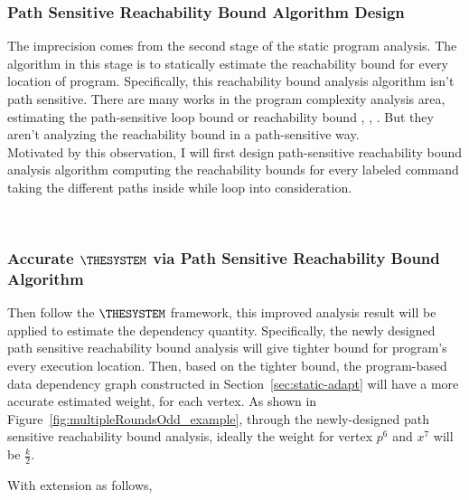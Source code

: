 \subsubsection{Path Sensitive Reachability Bound Algorithm Design}
\label{sec:refine-static-psreachability}
The imprecision comes from the second stage of the static program analysis.
The algorithm in this stage is to statically estimate the 
reachability bound for every location of program.
Specifically, this reachability bound analysis algorithm isn't path sensitive. 
There are many works in the program complexity analysis area, estimating the path-sensitive loop bound 
or reachability bound
\cite{GustafssonEL05, HumenbergerJK18}, 
\cite{BrockschmidtEFFG16,AlbertAGP08,AliasDFG10,Flores-MontoyaH14}, 
\cite{GulwaniZ10, SinnZV17,GulwaniJK09, GulwaniMC09, abs-2203-04243}. 
But they aren't analyzing the reachability
bound in a path-sensitive way.
\\
Motivated by this observation, I will first design path-sensitive reachability bound analysis algorithm computing the 
reachability bounds for every labeled command taking the different paths inside while loop into consideration.

\\
\subsubsection{Accurate $\THESYSTEM$ via Path Sensitive Reachability Bound Algorithm}
\label{sec:refine-static}
Then follow the $\THESYSTEM$ framework,
this improved analysis result will be applied to estimate the dependency quantity.
Specifically, the newly designed path sensitive reachability bound analysis will 
give tighter bound for program's every execution location.
Then, based on the tighter bound,
the program-based data dependency graph constructed in Section~\ref{sec:static-adapt}
will have a more accurate estimated weight, for each vertex.
%
As shown in Figure~\ref{fig:multipleRoundsOdd_example}, 
through the newly-designed path sensitive reachability bound analysis,
ideally the weight for vertex $p^6$ and $x^7$ will be $\frac{k}{2}$.

With extension as follows,
